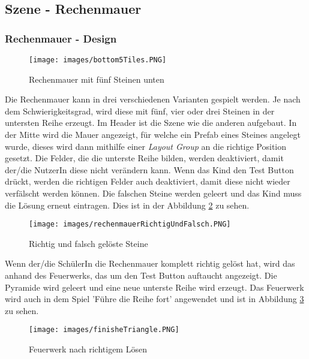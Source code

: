 \subsection{Szene - Rechenmauer}
\subsubsection{Rechenmauer - Design}
\begin{figure}[htbp]
  \centering
  \texttt{[image: images/bottom5Tiles.PNG]}
  \caption{Rechenmauer mit fünf Steinen unten}
  \label{triangle}
\end{figure}
Die Rechenmauer kann in drei verschiedenen Varianten gespielt werden. Je nach dem Schwierigkeitsgrad, wird diese mit fünf, vier oder drei Steinen in der untersten Reihe erzeugt. Im Header ist die Szene wie die anderen aufgebaut. In der Mitte wird die Mauer angezeigt, für welche ein Prefab eines Steines angelegt wurde, dieses wird dann mithilfe einer \textit{Layout Group} an die richtige Position gesetzt. Die Felder, die die unterste Reihe bilden, werden deaktiviert, damit der/die NutzerIn diese nicht verändern kann. Wenn das Kind den Test Button drückt, werden die richtigen Felder auch deaktiviert, damit diese nicht wieder verfälscht werden können. Die falschen Steine werden geleert und das Kind muss die Lösung erneut eintragen. Dies ist in der Abbildung \ref{wrongAndRightStone} zu sehen.\\
\begin{figure}[htbp]
  \centering
  \texttt{[image: images/rechenmauerRichtigUndFalsch.PNG]}
  \caption{Richtig und falsch gelöste Steine}
  \label{wrongAndRightStone}
\end{figure}Wenn der/die SchülerIn die Rechenmauer komplett richtig gelöst hat, wird das anhand des Feuerwerks, das um den Test Button auftaucht angezeigt. Die Pyramide wird geleert und eine neue unterste Reihe wird erzeugt. Das Feuerwerk wird auch in dem Spiel 'Führe die Reihe fort' angewendet und ist in Abbildung \ref{firework} zu sehen.
\begin{figure}[htbp]
  \centering
  \texttt{[image: images/finisheTriangle.PNG]}
  \caption{Feuerwerk nach richtigem Lösen}
  \label{firework}
\end{figure}
